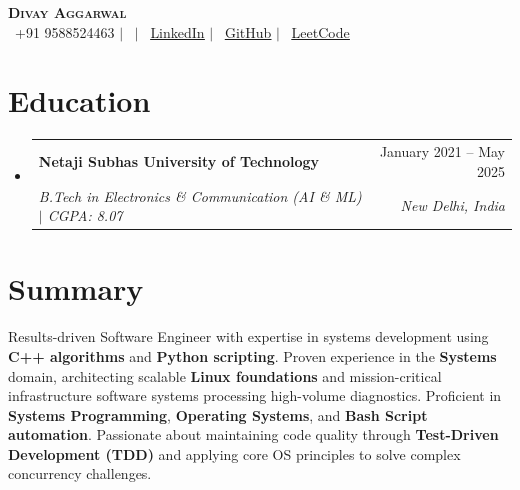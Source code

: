 \documentclass[letterpaper, 10pt]{article}
\makeatletter
\newcommand{\resumeSubheading}[4]{
  \vspace{-2pt}\item
    \begin{tabular*}{0.97\textwidth}[t]{l@{\extracolsep{\fill}}r}
      \textbf{#1} & #2 \\
      \textit{\small#3} & \textit{\small #4} \\
    \end{tabular*}\vspace{-5pt}
}
\newcommand{\resumeSubHeadingListStart}{\begin{itemize}[leftmargin=0.05in, label={}]}
\newcommand{\resumeSubHeadingListEnd}{\end{itemize}}
\makeatother
\begin{document}
\begin{center}
    \textbf{\Huge \scshape Divay Aggarwal} \\ \vspace{5pt}
    \small
    \faPhone\ +91 9588524463 \quad $|$ \quad
    \faEnvelope\ \href{mailto:{divay958@gmail.com}{\underline{divay958@gmail.com}}} \quad $|$ \quad
    \faLinkedin\ \href{https://www.linkedin.com/in/divay060203/}{\underline{LinkedIn}} \quad $|$ \quad
    \faGithub\ \href{https://github.com/Ddotdeveloper}{\underline{GitHub}} \quad $|$ \quad
    \faCode\ \href{https://leetcode.com/divay_garg/}{\underline{LeetCode}}
\end{center}

\section{Education}
  \resumeSubHeadingListStart
    \resumeSubheading
      {Netaji Subhas University of Technology}{January 2021 -- May 2025}
      {B.Tech in Electronics \& Communication (AI \& ML) $|$ CGPA: 8.07}{New Delhi, India}
  \resumeSubHeadingListEnd

\section{Summary}
\small{
Results-driven Software Engineer with expertise in systems development using \textbf{C++ algorithms} and \textbf{Python scripting}. Proven experience in the \textbf{Systems} domain, architecting scalable \textbf{Linux foundations} and mission-critical infrastructure software systems processing high-volume diagnostics. Proficient in \textbf{Systems Programming}, \textbf{Operating Systems}, and \textbf{Bash Script automation}. Passionate about maintaining code quality through \textbf{Test-Driven Development (TDD)} and applying core OS principles to solve complex concurrency challenges.
}

\end{document}

